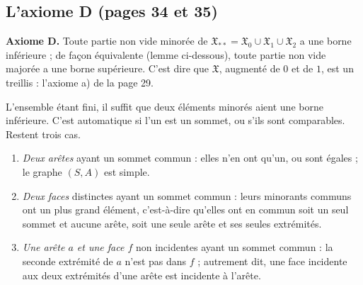 \documentclass[11pt,a4paper]{article}
\begin{document}
\subsection*{L'axiome D (pages 34 et 35)}

\textbf{Axiome D.} Toute partie non vide minorée de $\mathfrak{X}_{**} =
\mathfrak{X}_{0} \cup \mathfrak{X}_{1} \cup \mathfrak{X}_{2}$ a une borne
inférieure ; de façon équivalente (lemme ci-dessous), toute partie non vide
majorée a une borne supérieure. C'est dire que $\mathfrak{X}$, augmenté de $0$
et de $1$, est un treillis : l'axiome a) de la page 29.

L'ensemble étant fini, il suffit que deux éléments minorés aient une borne
inférieure. C'est automatique si l'un est un sommet, ou s'ils sont
comparables. Restent trois cas.
\begin{enumerate}
\item[1°)] \emph{Deux arêtes} ayant un sommet commun : elles n'en ont qu'un, ou
sont égales ; le graphe $(S, A)$ est simple.
\item[2°)] \emph{Deux faces} distinctes ayant un sommet commun : leurs minorants
communs ont un plus grand élément, c'est-à-dire qu'elles ont en commun soit un
seul sommet et aucune arête, soit une seule arête et ses seules extrémités.
\item[3°)] \emph{Une arête $a$ et une face $f$} non incidentes ayant un sommet
commun : la seconde extrémité de $a$ n'est pas dans $f$ ; autrement dit, une
face incidente aux deux extrémités d'une arête est incidente à l'arête.
\end{enumerate}
\end{document}
